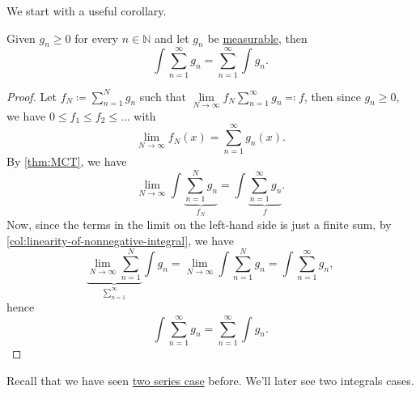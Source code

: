 We start with a useful corollary.
\begin{corollary}\label{col:Tonelli-theorem-for-nonnegative-series-and-integrals}
	Given \(g_{n}\geq 0\) for every \(n\in\mathbb{N} \) and let \(g_{n}\) be \hyperref[def:measurable-function]{measurable}, then
	\[
		\int \sum\limits_{n=1}^{\infty} g_{n} = \sum\limits_{n=1}^{\infty} \int g_{n}.
	\]
\end{corollary}
\begin{proof}
	Let \(f_{N} \coloneqq \sum\limits_{n=1}^{N} g_{n}\) such that \(\lim\limits_{N \to \infty} f_{N} \sum\limits_{n=1}^{\infty} g_{n} \eqqcolon f\), then since \(g_{n}\geq 0\), we have \(0\leq f_{1}\leq f_{2}\leq \dots  \) with
	\[
		\lim\limits_{N \to \infty} f_{N}(x) = \sum\limits_{n=1}^{\infty} g_{n}(x).
	\]
	By \autoref{thm:MCT}, we have
	\[
		\lim\limits_{N \to \infty} \int \underbrace{\sum\limits_{n=1}^N g_{n}}_{f_{N}} = \int \underbrace{\sum\limits_{n=1}^{\infty} g_{n }}_{f}.
	\]
	Now, since the terms in the limit on the left-hand side is just a finite sum, by \autoref{col:linearity-of-nonnegative-integral}, we have
	\[
		\underbrace{\lim\limits_{N \to \infty} \sum\limits_{n=1}^{N}}_{\sum\limits_{n=1}^{\infty} } \int g_{n} =\lim\limits_{N \to \infty} \int \sum\limits_{n=1}^N g_{n} = \int \sum\limits_{n=1}^{\infty} g_{n},
	\]
	hence
	\[
		\int \sum\limits_{n=1}^{\infty} g_{n} = \sum\limits_{n=1}^{\infty} \int g_{n}.
	\]
\end{proof}
\begin{remark}
	Recall that we have seen \hyperref[thm:Tonelli-theorem-for-series]{two series case} before. We'll later see two integrals cases.
\end{remark}

